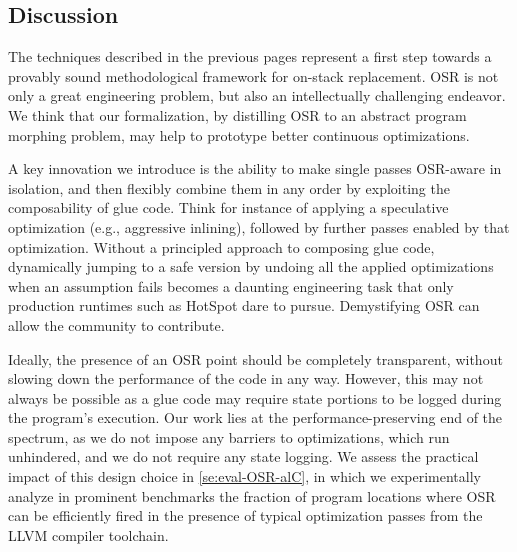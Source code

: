 






\subsection{Discussion}
The techniques described in the previous pages represent a first step towards a provably sound methodological framework for on-stack replacement. OSR is not only a great engineering problem, but also an intellectually challenging endeavor. We think that our formalization, by distilling OSR to an abstract program morphing problem, may help to prototype better continuous optimizations.

A key innovation we introduce is the ability to make single passes OSR-aware in isolation, and then flexibly combine them in any order by exploiting the composability of glue code. Think for instance of applying a speculative optimization (e.g., aggressive inlining), followed by further passes enabled by that optimization. Without a principled approach to composing glue code, dynamically jumping to a safe version by undoing all the applied optimizations when an assumption fails becomes a daunting engineering task that only production runtimes such as HotSpot dare to pursue. Demystifying OSR can allow the community to contribute.


Ideally, the presence of an OSR point should be completely transparent, without slowing down the performance of the code in any way. However, this may not always be possible as a glue code may require state portions to be logged during the program's execution. Our work lies at the performance-preserving end of the spectrum, as we do not impose any barriers to optimizations, which run unhindered, and we do not require any state logging. We assess the practical impact of this design choice in \mysection\ref{se:eval-OSR-alC}, in which we experimentally analyze in prominent benchmarks the fraction of program locations where OSR can be efficiently fired in the presence of typical optimization passes from the LLVM compiler toolchain. %

